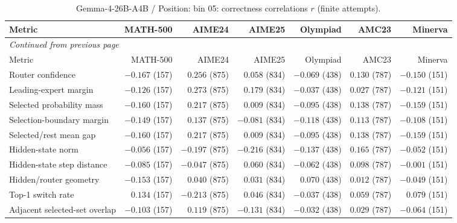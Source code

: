 \begingroup\scriptsize\setlength{\tabcolsep}{4pt}
\begin{longtable}{@{}lrrrrrr@{}}
\caption{Gemma-4-26B-A4B / Position: bin 05: correctness correlations $r$ (finite attempts).}\label{tab:multi-gemma-position-bin_05}\\
\toprule
Metric & MATH-500 & AIME24 & AIME25 & Olympiad & AMC23 & Minerva \\
\midrule\endfirsthead
\multicolumn{7}{l}{\textit{Continued from previous page}}\\
\toprule
Metric & MATH-500 & AIME24 & AIME25 & Olympiad & AMC23 & Minerva \\
\midrule\endhead
\bottomrule\endfoot
Router confidence & $-0.167$ (157) & $0.256$ (875) & $0.058$ (834) & $-0.069$ (438) & $0.130$ (787) & $-0.150$ (151) \\
Leading-expert margin & $-0.126$ (157) & $0.273$ (875) & $0.179$ (834) & $-0.037$ (438) & $0.027$ (787) & $-0.121$ (151) \\
Selected probability mass & $-0.160$ (157) & $0.217$ (875) & $0.009$ (834) & $-0.095$ (438) & $0.138$ (787) & $-0.159$ (151) \\
Selection-boundary margin & $-0.149$ (157) & $0.137$ (875) & $-0.081$ (834) & $-0.118$ (438) & $0.113$ (787) & $-0.108$ (151) \\
Selected/rest mean gap & $-0.160$ (157) & $0.217$ (875) & $0.009$ (834) & $-0.095$ (438) & $0.138$ (787) & $-0.159$ (151) \\
Hidden-state norm & $-0.056$ (157) & $-0.197$ (875) & $-0.216$ (834) & $-0.137$ (438) & $0.165$ (787) & $-0.052$ (151) \\
Hidden-state step distance & $-0.085$ (157) & $-0.047$ (875) & $0.060$ (834) & $-0.062$ (438) & $0.098$ (787) & $-0.001$ (151) \\
Hidden/router geometry & $-0.153$ (157) & $0.040$ (875) & $0.031$ (834) & $0.070$ (438) & $0.012$ (787) & $-0.049$ (151) \\
Top-1 switch rate & $0.134$ (157) & $-0.213$ (875) & $0.046$ (834) & $-0.037$ (438) & $0.059$ (787) & $0.079$ (151) \\
Adjacent selected-set overlap & $-0.103$ (157) & $0.119$ (875) & $-0.131$ (834) & $-0.032$ (438) & $0.029$ (787) & $-0.064$ (151) \\
\end{longtable}\endgroup

